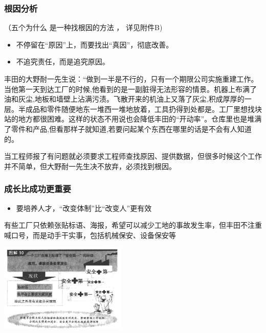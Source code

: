 \hypertarget{ux6839ux56e0ux5206ux6790}{%
\subsubsection{根因分析}\label{ux6839ux56e0ux5206ux6790}}

（五个为什么 是一种找根因的方法 ， 详见附件B)

\begin{itemize}
\tightlist
\item
  不停留在``原因''上，而要找出``真因''，彻底改善。
\item
  不追究责任，而是追究原因。\\
\end{itemize}

丰田的大野耐一先生说：“做到一半是不行的，只有一个期限公司实施重建工作。当他第一天到达工厂的时候,他看到的是一副脏得无法形容的情景。机器上布满了油和灰尘,地板和墙壁上沾满污渍。飞散开来的机油上又落了灰尘,积成厚厚的一层。半成品和零件随便地东一堆西一堆地放着，工具扔得到处都是。工厂里想找块站的地方都很困难。这样的状态不用说也会降低丰田的“开动率”。仓库里也是堆满了零件和产品,但看那样子就知道,若要问起某个东西在哪里的话是不会有人知道的。

当工程师报了有问题就必须要求工程师查找原因、提供数据，但很多时候这个工作并不简单，但大野耐一先生决不放弃，必须找到根因。

\hypertarget{ux6210ux957fux6bd4ux6210ux529fux66f4ux91cdux8981}{%
\subsubsection{成长比成功更重要}\label{ux6210ux957fux6bd4ux6210ux529fux66f4ux91cdux8981}}

\begin{itemize}
\tightlist
\item
  要培养人才，``改变体制''比``改变人''更有效
\end{itemize}

有些工厂只依赖张贴标语、海报，希望可以减少工地的事故发生率，但丰田不注重喊口号，而是动手干实事，包括机械保安、设备保安等


\includegraphics[width=6cm]{ft_2231.png}

